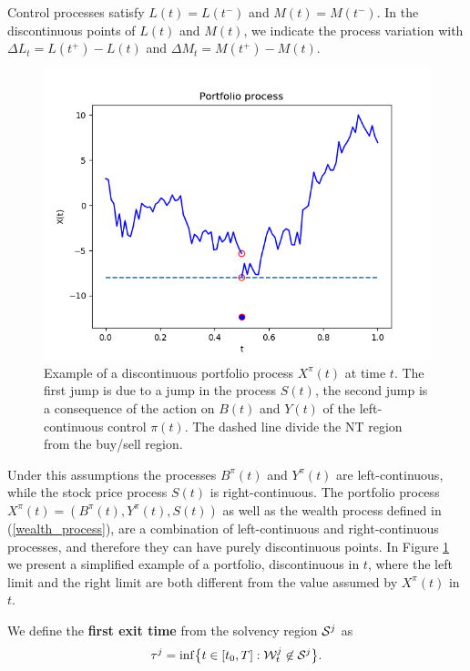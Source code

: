 Control processes satisfy $L(t) = L(t^-)$ and $M(t) = M(t^-)$.
In the discontinuous points of $L(t)$ and $M(t)$, we indicate the process variation with $\Delta L_t= L(t^+)-L(t)$ and $\Delta M_t= M(t^+)-M(t)$.\\
\begin{figure}[t!]
 \centering
 \includegraphics[scale=0.5]{./pics/portfolio_process.png}
 \caption{Example of a discontinuous portfolio process $X^{\pi}(t)$ at time $t$. 
 The first jump is due to a jump in the process $S(t)$, the second jump is a consequence of the action on $B(t)$ and $Y(t)$ 
 of the left-continuous control $\pi(t)$. The dashed line divide the NT region from the buy/sell region.}
 \label{fig:portfolio process}
\end{figure}
Under this assumptions the processes $B^{\pi}(t)$ and $Y^{\pi}(t)$ are left-continuous, while the stock price process $S(t)$ is right-continuous. The portfolio process 
$X^{\pi}(t) = (B^{\pi}(t),Y^{\pi}(t),S(t))$ as well as the wealth process defined in 
(\ref{wealth_process}), are a combination of left-continuous and right-continuous processes, and therefore they can have purely discontinuous points.
In Figure \ref{fig:portfolio process} we present a simplified example of a portfolio, discontinuous in $t$, 
where the left limit and the right limit are both different from the value assumed by $X^{\pi}(t)$ in $t$.
\begin{Definition}
We define the \textbf{first exit time} from the solvency region $\mathcal{S}^j$ as
\begin{equation}\label{exit_time}
 \tau^j = \inf \bigl\{ t \in [t_0,T] : \mathcal{W}^j_t \not\in \mathcal{S}^j \bigr\}.
\end{equation} 
\end{Definition}
